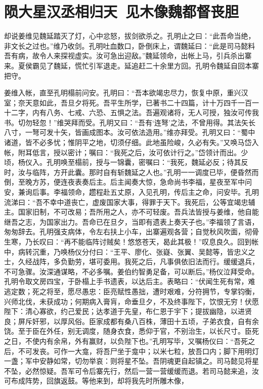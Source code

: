 \chapter{陨大星汉丞相归天~见木像魏都督丧胆}

却说姜维见魏延踏灭了灯，心中忿怒，拔剑欲杀之。孔明止之曰：“此吾命当绝，非文长之过也。”维乃收剑。孔明吐血数口，卧倒床上，谓魏延曰：“此是司马懿料吾有病，故令人来探视虚实。汝可急出迎敌。”魏延领命，出帐上马，引兵杀出寨来。夏侯霸见了魏延，慌忙引军退走。延追赶二十余里方回。孔明令魏延自回本寨把守。

姜维入帐，直至孔明榻前问安。孔明曰：“吾本欲竭忠尽力，恢复中原，重兴汉室；奈天意如此，吾旦夕将死。吾平生所学，已著书二十四篇，计十万四千一百一十二字，内有八务、七戒、六恐、五惧之法。吾遍观诸将，无人可授，独汝可传我书。切勿轻忽！”维哭拜而受。孔明又曰：“吾有‘连弩’之法，不曾用得。其法矢长八寸，一弩可发十矢，皆画成图本。汝可依法造用。”维亦拜受。孔明又曰：“蜀中诸道，皆不必多忧；惟阴平之地，切须仔细。此地虽险峻，久必有失。”又唤马岱入帐，附耳低言，授以密计；嘱曰：“我死之后，汝可依计行之。”岱领计而出。少顷，杨仪入。孔明唤至榻前，授与一锦囊，密嘱曰：“我死，魏延必反；待其反时，汝与临阵，方开此囊。那时自有斩魏延之人也。”孔明一一调度已毕，便昏然而倒，至晚方苏，便连夜表奏后主。后主闻奏大惊，急命尚书李福，星夜至军中问安，兼询后事。李福领命，趱程赴五丈原，入见孔明，传后主之命，问安毕。孔明流涕曰：“吾不幸中道丧亡，虚废国家大事，得罪于天下。我死后，公等宜竭忠辅主。国家旧制，不可改易；吾所用之人，亦不可轻废。吾兵法皆授与姜维，他自能继吾之志，为国家出力。吾命已在旦夕，当即有遗表上奏天子也。”李福领了言语，匆匆辞去。孔明强支病体，令左右扶上小车，出寨遍观各营；自觉秋风吹面，彻骨生寒，乃长叹曰：“再不能临阵讨贼矣！悠悠苍天，曷此其极！”叹息良久。回到帐中，病转沉重，乃唤杨仪分付曰：“王平、廖化、张嶷、张翼、吴懿等，皆忠义之士，久经战阵，多负勤劳，堪可委用。我死之后，凡事俱依旧法而行。缓缓退兵，不可急骤。汝深通谋略，不必多嘱。姜伯约智勇足备，可以断后。”杨仪泣拜受命。孔明令取文房四宝，于卧榻上手书遗表，以达后主。表略曰：“伏闻生死有常，难逃定数；死之将至，愿尽愚忠：臣亮赋性愚拙，遭时艰难，分符拥节，专掌钧衡，兴师北伐，未获成功；何期病入膏肓，命垂旦夕，不及终事陛下，饮恨无穷！伏愿陛下：清心寡欲，约己爱民；达孝道于先皇，布仁恩于宇下；提拔幽隐，以进贤良；屏斥奸邪，以厚风俗。臣家成都有桑八百株，薄田十五顷，子弟衣食，自有余饶。至于臣在外任，别无调度，随身衣食，悉仰于官，不别治生，以长尺寸。臣死之日，不使内有余帛，外有赢财，以负陛下也。”孔明写毕，又嘱杨仪曰：“吾死之后，不可发丧。可作一大龛，将吾尸坐于龛中；以米七粒，放吾口内；脚下用明灯一盏；军中安静如常，切勿举哀：则将星不坠。吾阴魂更自起镇之。司马懿见将星不坠，必然惊疑。吾军可令后寨先行，然后一营一营缓缓而退。若司马懿来追，汝可布成阵势，回旗返鼓。等他来到，却将我先时所雕木像，

